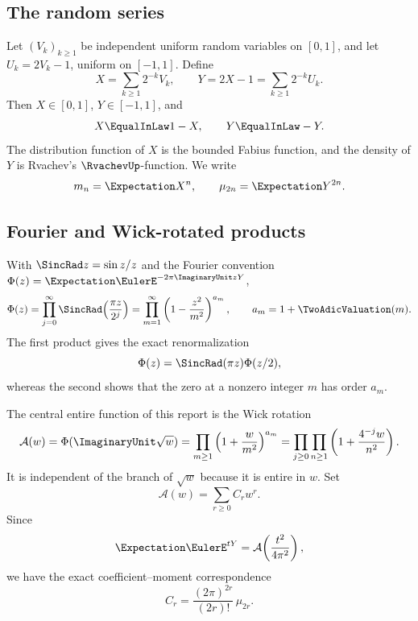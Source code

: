 \documentclass[11pt]{article}
\numberwithin{equation}{section}
\theoremstyle{definition}
\theoremstyle{remark}
\begin{document}
\subsection{The random series}

Let $(V_k)_{k\ge1}$ be independent uniform random variables on $[0,1]$, and let
$U_k=2V_k-1$, uniform on $[-1,1]$.  Define
\begin{equation}\label{p5:eq:X-Y-def}
 X=\sum_{k\ge1}2^{-k}V_k,\qquad
 Y=2X-1=\sum_{k\ge1}2^{-k}U_k.
\end{equation}
Then $X\in[0,1]$, $Y\in[-1,1]$, and
\begin{equation}\label{p5:eq:symmetry}
 X\EqualInLaw1-X,\qquad Y\EqualInLaw-Y.
\end{equation}
The distribution function of $X$ is the bounded Fabius function, and the density
of $Y$ is Rvachev's $\RvachevUp$-function.  We write
\begin{equation}\label{p5:eq:moments-def}
 m_n=\Expectation X^n,\qquad \mu_{2n}=\Expectation Y^{2n}.
\end{equation}

\subsection{Fourier and Wick-rotated products}

With $\SincRad z=\sin z/z$ and the Fourier convention
$\Phi(z)=\Expectation\EulerE^{-2\pi\ImaginaryUnit zY}$,
\begin{equation}\label{p5:eq:Phi-products}
 \Phi(z)=\prod_{j=0}^{\infty}\SincRad\!\left(\frac{\pi z}{2^j}\right)
 =\prod_{m=1}^{\infty}\left(1-\frac{z^2}{m^2}\right)^{a_m},
 \qquad a_m=1+\TwoAdicValuation(m).
\end{equation}
The first product gives the exact renormalization
\begin{equation}\label{p5:eq:Phi-renorm}
 \Phi(z)=\SincRad(\pi z)\Phi(z/2),
\end{equation}
whereas the second shows that the zero at a nonzero integer $m$ has order
$a_m$.

The central entire function of this report is the Wick rotation
\begin{equation}\label{p5:eq:A-def}
 \mathcal A(w)=\Phi(\ImaginaryUnit\sqrt w)
 =\prod_{m\ge1}\left(1+\frac{w}{m^2}\right)^{a_m}
 =\prod_{j\ge0}\prod_{n\ge1}\left(1+\frac{4^{-j}w}{n^2}\right).
\end{equation}
It is independent of the branch of $\sqrt w$ because it is entire in $w$.
Set
\begin{equation}\label{p5:eq:C-def}
 \mathcal A(w)=\sum_{r\ge0}C_rw^r.
\end{equation}
Since
\begin{equation}\label{p5:eq:mgf-A}
 \Expectation\EulerE^{tY}=\mathcal A\!\left(\frac{t^2}{4\pi^2}\right),
\end{equation}
we have the exact coefficient--moment correspondence
\begin{equation}\label{p5:eq:C-moment}
 C_r=\frac{(2\pi)^{2r}}{(2r)!}\,\mu_{2r}.
\end{equation}
\end{document}
